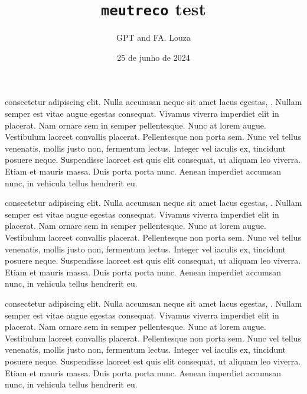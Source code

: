 \documentclass[12pt]{article}
\title{\texttt{meutreco} test}
\author{GPT and FA. Louza}
\begin{document}
\date{25 de junho de 2024}
\maketitle

\listofchanges




 consectetur adipiscing elit. Nulla accumsan neque sit amet lacus egestas, . Nullam semper est vitae augue egestas consequat. Vivamus viverra imperdiet elit in placerat. Nam ornare sem in semper pellentesque. Nunc at lorem augue. Vestibulum laoreet convallis placerat. Pellentesque non porta sem. Nunc vel tellus venenatis, mollis justo non, fermentum lectus. Integer vel iaculis ex, tincidunt posuere neque. Suspendisse laoreet est quis elit consequat, ut aliquam leo viverra. Etiam et mauris massa. Duis porta porta nunc. Aenean imperdiet accumsan nunc, in vehicula tellus hendrerit eu.



 consectetur adipiscing elit. Nulla accumsan neque sit amet lacus egestas, . Nullam semper est vitae augue egestas consequat. Vivamus viverra imperdiet elit in placerat. Nam ornare sem in semper pellentesque. Nunc at lorem augue. Vestibulum laoreet convallis placerat. Pellentesque non porta sem. Nunc vel tellus venenatis, mollis justo non, fermentum lectus. Integer vel iaculis ex, tincidunt posuere neque. Suspendisse laoreet est quis elit consequat, ut aliquam leo viverra. Etiam et mauris massa. Duis porta porta nunc. Aenean imperdiet accumsan nunc, in vehicula tellus hendrerit eu.



 consectetur adipiscing elit. Nulla accumsan neque sit amet lacus egestas, . Nullam semper est vitae augue egestas consequat. Vivamus viverra imperdiet elit in placerat. Nam ornare sem in semper pellentesque. Nunc at lorem augue. Vestibulum laoreet convallis placerat. Pellentesque non porta sem. Nunc vel tellus venenatis, mollis justo non, fermentum lectus. Integer vel iaculis ex, tincidunt posuere neque. Suspendisse laoreet est quis elit consequat, ut aliquam leo viverra. Etiam et mauris massa. Duis porta porta nunc. Aenean imperdiet accumsan nunc, in vehicula tellus hendrerit eu.
\end{document}
